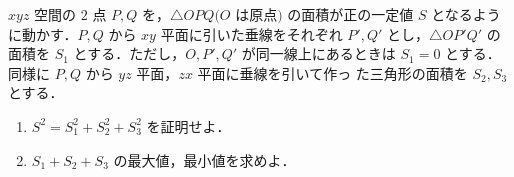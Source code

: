 \documentclass[../../main.tex]{subfiles}
\begin{document}
$xyz$ 空間の $2$ 点 $P, Q$ を，$\triangle OPQ (O$ は原点$)$ の面積が正の一定値 $S$ となるように動かす．$P, Q$ から $xy$ 平面に引いた垂線をそれぞれ $P', Q'$ とし，$\triangle OP'Q'$ の面積を $S_1$ とする．ただし，$O, P', Q'$ が同一線上にあるときは $S_1=0$ とする．同様に $P, Q$ から $yz$ 平面，$zx$ 平面に垂線を引いて作っ
た三角形の面積を $S_2, S_3$ とする．
\begin{enumerate}
  \item $S^2 = S_1^2 + S_2^2 + S_3^2$ を証明せよ．
  \item $S_1+S_2+S_3$ の最大値，最小値を求めよ．
\end{enumerate}
\end{document}
